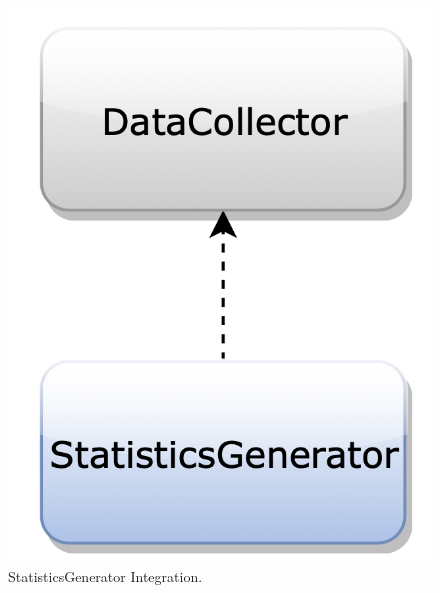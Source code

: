 \begin{figure}[H]
\begin{center}
\begin{minipage}[c]{.40\textwidth}
\includegraphics[scale=0.35]{Images/IntegrationPlanImages/fig6.png}
\caption{StatisticsGenerator Integration.}
        \end{minipage}
      \end{center}
\end{figure}

